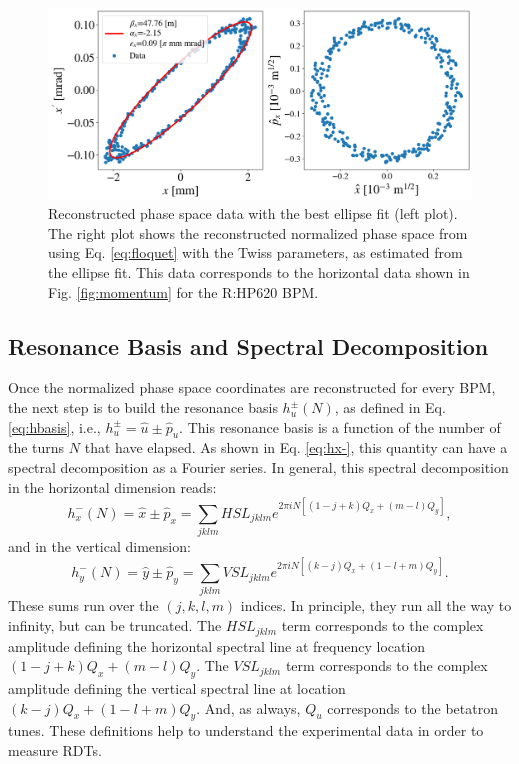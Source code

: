 \begin{figure}[H]
    \centering
    \includegraphics[width=\columnwidth]{chapter4/ellipse_data.png}
    \caption{Reconstructed phase space data with the best ellipse fit (left plot). The right plot shows the reconstructed normalized phase space from using Eq. \ref{eq:floquet} with the Twiss parameters, as estimated from the ellipse fit. This data corresponds to the horizontal data shown in Fig. \ref{fig:momentum} for the R:HP620 BPM.}
    \label{fig:ellipse}
\end{figure}

\subsection{Resonance Basis and Spectral Decomposition}

Once the normalized phase space coordinates are reconstructed for every BPM, the next step is to build the resonance basis $h_u^{\pm}(N)$, as defined in Eq. \ref{eq:hbasis}, i.e., $h_u^{\pm}=\hat{u}\pm \hat{p}_u$. This resonance basis is a function of the number of the turns $N$ that have elapsed. As shown in Eq. \ref{eq:hx-}, this quantity can have a spectral decomposition as a Fourier series. In general, this spectral decomposition in the horizontal dimension reads: 
\begin{equation}
    \label{eq:hxspect}
    h_x^{-}(N)= \hat{x} \pm \hat{p}_x = \sum_{jklm}HSL_{jklm}e^{2\pi i N \left[ \left( 1-j+k\right)Q_x+\left( m-l \right)Q_y\right]},
\end{equation}
and in the vertical dimension:
\begin{equation}
    \label{eq:hyspect}
    h_y^{-}(N)= \hat{y} \pm \hat{p}_y = \sum_{jklm}VSL_{jklm}e^{2\pi i N \left[ \left( k-j\right)Q_x+\left(1-l+m \right)Q_y\right]}.
\end{equation}
These sums run over the $(j,k,l,m)$ indices. In principle, they run all the way to infinity, but can be truncated. The $HSL_{jklm}$ term corresponds to the complex amplitude defining the horizontal spectral line at frequency location $(1-j+k)Q_x+(m-l)Q_y$. The $VSL_{jklm}$ term corresponds to the complex amplitude defining the vertical spectral line at location $(k-j)Q_x+(1-l+m)Q_y$. And, as always, $Q_u$ corresponds to the betatron tunes. These definitions help to understand the experimental data in order to measure RDTs.

